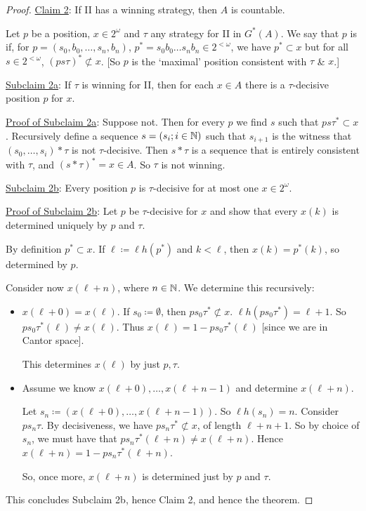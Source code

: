 \documentclass[]{article}
\newcommand{\om}{\omega}
\newcommand{\lom}{{<\omega}}
\newcommand{\lh}{\ell h}
\begin{document}
\begin{proof}
    \underline{Claim 2}: If II has a winning strategy, then $A$ is countable.

    Let $p$ be a position, $x \in 2^\om$ and $\tau$ any strategy for II in $G^\ast(A)$. We say that $p$ is  if, for $p = (s_0,b_0,\dots,s_n,b_n)$, $p^\ast = s_0b_0\dots s_nb_n \in 2^\lom$, we have $p^\ast \subset x$ but for all $ s \in 2^\lom$, $(ps\tau)^\ast \not\subset x$.
    [So $p$ is the `maximal' position consistent with $\tau$ \& $x$.] \qedsymbol

    \underline{Subclaim 2a}: If $\tau$ is winning for II, then for each $x\in A$ there is a $\tau$-decisive position $p$ for $x$.

    \underline{Proof of Subclaim 2a}: Suppose not. Then for every $p$ we find $s$ such that $ps\tau^\ast \subset x$. Recursively define a sequence $s = (s_i;i\in \mathbb{N})$ such that $s_{i+1}$ is the witness that $(s_0,\dots,s_i)\ast \tau$ is not $\tau$-decisive. Then $s\ast \tau$ is a sequence that is entirely consistent with $\tau$, and $(s\ast \tau)^\ast = x \in A$. So $\tau$ is not winning. \qedsymbol

    \underline{Subclaim 2b}: Every position $p$ is $\tau$-decisive for at most one $x \in 2^\om$.


    \underline{Proof of Subclaim 2b}: Let $p$ be $\tau$-decisive for $x$ and show that every $x(k)$ is determined uniquely by $p$ and $\tau$.

    By definition $p^\ast \subset x$. If $\ell \coloneqq \lh(p^\ast)$ and $ k < \ell$, then $x(k) = p^\ast(k)$, so determined by $p$.

    Consider now $x(\ell + n)$, where $n\in\mathbb{N}$. We determine this recursively:
    \begin{itemize}
        \item $x(\ell + 0) = x(\ell)$. If $s_0 \coloneqq \emptyset$, then $ps_0\tau^\ast \not\subset x$. $\lh(ps_0\tau^\ast) = \ell + 1$. So $ps_0\tau^\ast(\ell)\ne x(\ell)$. Thus $x(\ell) = 1 - ps_0\tau^\ast(\ell)$ [since we are in Cantor space].
        
        This determines $x(\ell)$ by just $p,\tau$.

        \item Assume we know $x(\ell + 0),\dots,x(\ell + n - 1)$ and determine $x(\ell + n)$.
        
        Let $s_n\coloneqq (x(\ell + 0),\dots,x(\ell + n - 1))$. So $\lh(s_n) = n$. Consider $ps_n\tau$. By decisiveness, we have $ps_n\tau^\ast\not\subset x$, of length $\ell + n + 1$. So by choice of $s_n$, we must have that $ps_n\tau^\ast(\ell + n)\ne x(\ell + n)$. Hence $x(\ell + n) = 1 - ps_n\tau^\ast(\ell + n)$.

        So, once more, $x(\ell + n)$ is determined just by $p$ and $\tau$. \qedsymbol
    \end{itemize}

    This concludes Subclaim 2b, hence Claim 2, and hence the theorem.
\end{proof}
\end{document}
